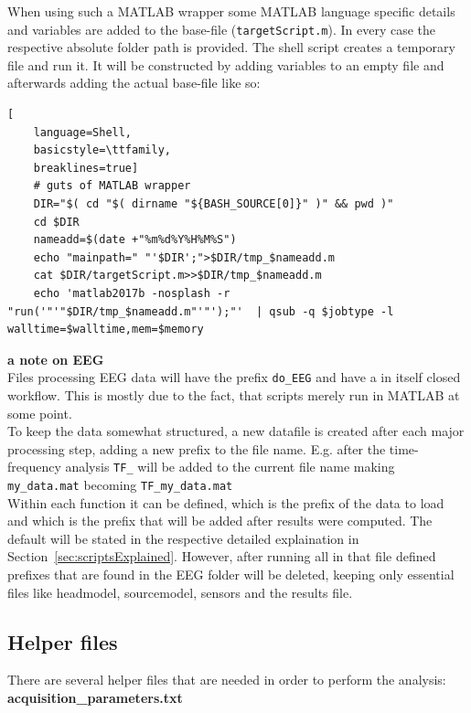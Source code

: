 \documentclass[12pt,a4paper]{scrartcl}
\begin{document}
\noindent When using such a MATLAB wrapper some MATLAB language specific details and variables are added to the base-file (\texttt{targetScript.m}). In every case the respective absolute folder path is provided. The shell script creates a temporary file and run it. It will be constructed by adding variables to an empty file and afterwards adding the actual base-file like so:
\begin{lstlisting}[
    language=Shell,
    basicstyle=\ttfamily,
    breaklines=true]
    # guts of MATLAB wrapper
    DIR="$( cd "$( dirname "${BASH_SOURCE[0]}" )" && pwd )"
    cd $DIR
    nameadd=$(date +"%m%d%Y%H%M%S")
    echo "mainpath=" "'$DIR';">$DIR/tmp_$nameadd.m
    cat $DIR/targetScript.m>>$DIR/tmp_$nameadd.m
    echo 'matlab2017b -nosplash -r "run('"'"$DIR/tmp_$nameadd.m"'"');"'  | qsub -q $jobtype -l walltime=$walltime,mem=$memory
\end{lstlisting}
\medskip
\noindent\textbf{a note on EEG}\\
\noindent Files processing EEG data will have the prefix \texttt{do\_EEG} and have a in itself closed workflow. This is mostly due to the fact, that scripts merely run in MATLAB at some point.\\
\noindent To keep the data somewhat structured, a new datafile is created after each major processing step, adding a new prefix to the file name. E.g. after the time-frequency analysis \texttt{TF\_} will be added to the current file name making \texttt{my\_data.mat} becoming \texttt{TF\_my\_data.mat}\\

\noindent Within each function it can be defined, which is the prefix of the data to load and which is the prefix that will be added after results were computed. The default will be stated in the respective detailed explaination in Section~\ref{sec:scriptsExplained}. However, after running \texttt{} all in that file defined prefixes that are found in the EEG folder will be deleted, keeping only essential files like headmodel, sourcemodel, sensors and the results file.\\

\subsection{Helper files}
There are several helper files that are needed in order to perform the analysis:\\

\noindent\textbf{acquisition\_parameters.txt}
\end{document}
